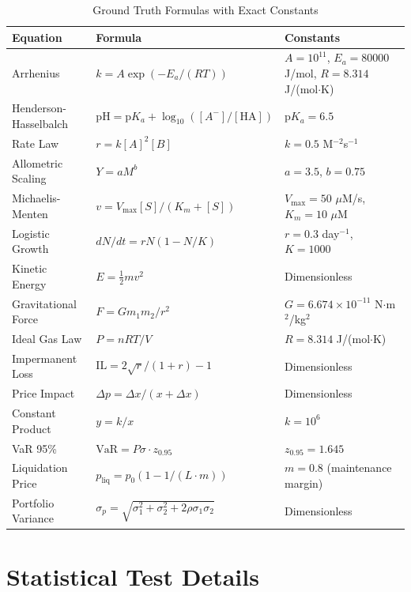 \documentclass[twoside,11pt]{article}
\begin{document}
\begin{table}[H]
\centering
\caption{Ground Truth Formulas with Exact Constants}
\label{tab:formulas_detailed}
\scriptsize
\begin{tabular}{lll}
\toprule
\textbf{Equation} & \textbf{Formula} & \textbf{Constants} \\
\midrule
Arrhenius & $k = A\exp(-E_a/(RT))$ & $A=10^{11}$, $E_a=80000$ J/mol, $R=8.314$ J/(mol$\cdot$K) \\
Henderson-Hasselbalch & $\text{pH} = \text{p}K_a + \log_{10}([A^-]/[\text{HA}])$ & $\text{p}K_a = 6.5$ \\
Rate Law & $r = k[A]^2[B]$ & $k = 0.5$ M$^{-2}$s$^{-1}$ \\
Allometric Scaling & $Y = aM^b$ & $a = 3.5$, $b = 0.75$ \\
Michaelis-Menten & $v = V_{\max}[S]/(K_m + [S])$ & $V_{\max} = 50$ $\mu$M/s, $K_m = 10$ $\mu$M \\
Logistic Growth & $dN/dt = rN(1-N/K)$ & $r = 0.3$ day$^{-1}$, $K = 1000$ \\
Kinetic Energy & $E = \frac{1}{2}mv^2$ & Dimensionless \\
Gravitational Force & $F = Gm_1m_2/r^2$ & $G = 6.674 \times 10^{-11}$ N$\cdot$m$^2$/kg$^2$ \\
Ideal Gas Law & $P = nRT/V$ & $R = 8.314$ J/(mol$\cdot$K) \\
Impermanent Loss & $\text{IL} = 2\sqrt{r}/(1+r) - 1$ & Dimensionless \\
Price Impact & $\Delta p = \Delta x/(x + \Delta x)$ & Dimensionless \\
Constant Product & $y = k/x$ & $k = 10^6$ \\
VaR 95\% & $\text{VaR} = P\sigma \cdot z_{0.95}$ & $z_{0.95} = 1.645$ \\
Liquidation Price & $p_{\text{liq}} = p_0(1 - 1/(L \cdot m))$ & $m = 0.8$ (maintenance margin) \\
Portfolio Variance & $\sigma_p = \sqrt{\sigma_1^2 + \sigma_2^2 + 2\rho\sigma_1\sigma_2}$ & Dimensionless \\
\bottomrule
\end{tabular}
\end{table}


\section{Statistical Test Details}
\label{app:statistical_tests}
\end{document}

